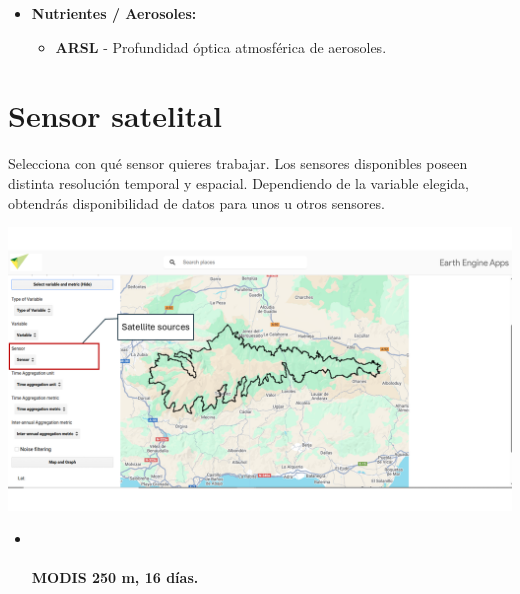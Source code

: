 \documentclass[
]{book}
\providecommand{\tightlist}{%
  \setlength{\itemsep}{0pt}\setlength{\parskip}{0pt}}
\begin{document}
\begin{itemize}
\tightlist
\item
  \textbf{Nutrientes / Aerosoles:}

  \begin{itemize}
  \tightlist
  \item
    \textbf{ARSL} - Profundidad óptica atmosférica de aerosoles.
  \end{itemize}
\end{itemize}

\chapter{Sensor satelital}\label{sensor}

Selecciona con qué sensor quieres trabajar. Los sensores disponibles poseen distinta resolución temporal y espacial. Dependiendo de la variable elegida, obtendrás disponibilidad de datos para unos u otros sensores.

\includegraphics{assets/sensor.png}

\begin{itemize}
\item ~
  \subsubsection{\texorpdfstring{\textbf{MODIS 250 m, 16 días.}}{MODIS 250 m, 16 días.}}\label{modis-250-m-16-duxedas.}
\end{itemize}
\end{document}
